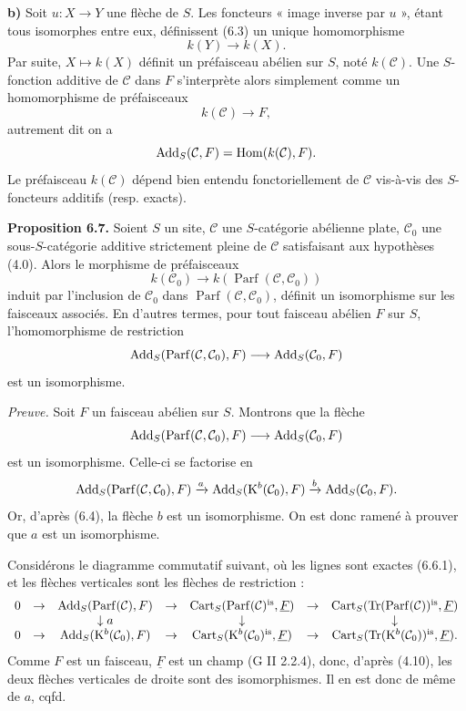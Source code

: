 \documentclass[11pt]{article}
\newcommand{\Parf}{\operatorname{Parf}}
\begin{document}
\textbf{b)} Soit \(u:X\to Y\) une flèche de \(S\). Les foncteurs « image inverse par \(u\) », étant tous isomorphes entre eux, définissent (6.3) un unique homomorphisme
\[
  k(Y)\longrightarrow k(X).
\]
Par suite, \(X\mapsto k(X)\) définit un préfaisceau abélien sur \(S\), noté \(k(\mathcal C)\). Une \(S\)-fonction additive de \(\mathcal C\) dans \(F\) s'interprète alors simplement comme un homomorphisme de préfaisceaux
\[
  k(\mathcal C)\longrightarrow F,
\]
autrement dit on a
\[
  \operatorname{Add}_S(\mathcal C,F)=\operatorname{Hom}(k(\mathcal C),F).
\]
Le préfaisceau \(k(\mathcal C)\) dépend bien entendu fonctoriellement de \(\mathcal C\) vis-à-vis des \(S\)-foncteurs additifs (resp. exacts).

\textbf{Proposition 6.7.} Soient \(S\) un site, \(\mathcal C\) une \(S\)-catégorie abélienne plate, \(\mathcal C_0\) une sous-\(S\)-catégorie additive strictement pleine de \(\mathcal C\) satisfaisant aux hypothèses (4.0). Alors le morphisme de préfaisceaux
\[
  k(\mathcal C_0)\longrightarrow k(\Parf(\mathcal C,\mathcal C_0))
\]
induit par l'inclusion de \(\mathcal C_0\) dans \(\Parf(\mathcal C,\mathcal C_0)\), définit un isomorphisme sur les faisceaux associés. En d'autres termes, pour tout faisceau abélien \(F\) sur \(S\), l'homomorphisme de restriction
\[
  \Add_S(\Parf(\mathcal C,\mathcal C_0),F)
  \longrightarrow
  \Add_S(\mathcal C_0,F)
\]
est un isomorphisme.

\emph{Preuve.} Soit \(F\) un faisceau abélien sur \(S\). Montrons que la flèche
\[
  \Add_S(\Parf(\mathcal C,\mathcal C_0),F)
  \longrightarrow
  \Add_S(\mathcal C_0,F)
\]
est un isomorphisme. Celle-ci se factorise en
\[
\Add_S(\Parf(\mathcal C,\mathcal C_0),F)
 \xrightarrow{a}
\Add_S(\Kpx^b(\mathcal C_0),F)
 \xrightarrow{b}
\Add_S(\mathcal C_0,F).
\]
Or, d'après (6.4), la flèche \(b\) est un isomorphisme. On est donc ramené à prouver que \(a\) est un isomorphisme.

Considérons le diagramme commutatif suivant, où les lignes sont exactes (6.6.1), et les flèches verticales sont les flèches de restriction :
\[
\begin{array}{ccccccccc}
0&\to&\Add_S(\Parf(\mathcal C),F)&\to&\Cart_S(\Parf(\mathcal C)^{\is},\underline F)&\to&\Cart_S(\Tr(\Parf(\mathcal C))^{\is},\underline F)\\
&&\downarrow a&&\downarrow&&\downarrow\\
0&\to&\Add_S(\Kpx^b(\mathcal C_0),F)&\to&\Cart_S(\Kpx^b(\mathcal C_0)^{\is},\underline F)&\to&\Cart_S(\Tr(\Kpx^b(\mathcal C_0))^{\is},\underline F).
\end{array}
\]
Comme \(F\) est un faisceau, \(\underline F\) est un champ (G II 2.2.4), donc, d'après (4.10), les deux flèches verticales de droite sont des isomorphismes. Il en est donc de même de \(a\), cqfd.
\end{document}
